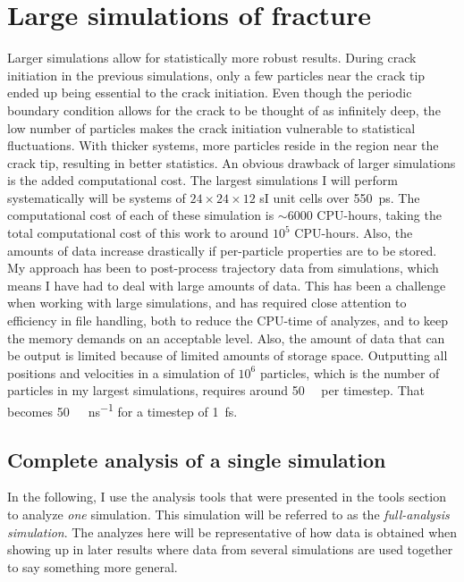 \section{Large simulations of fracture}
Larger simulations allow for statistically more robust results. During crack initiation in the previous simulations, only a few particles near the crack tip ended up being essential to the crack initiation. Even though the periodic boundary condition allows for the crack to be thought of as infinitely deep, the low number of particles makes the crack initiation vulnerable to statistical fluctuations. With thicker systems, more particles reside in the region near the crack tip, resulting in better statistics. An obvious drawback of larger simulations is the added computational cost. The largest simulations I will perform systematically will be systems of $24\times 24\times 12$ sI unit cells over \SI{550}{\pico\second}. The computational cost of each of these simulation is $\sim 6000$ CPU-hours, taking the total computational cost of this work to around $10^5$ CPU-hours. Also, the amounts of data increase drastically if per-particle properties are to be stored. My approach has been to post-process trajectory data from simulations, which means I have had to deal with large amounts of data. This has been a challenge when working with large simulations, and has required close attention to efficiency in file handling, both to reduce the CPU-time of analyzes, and to keep the memory demands on an acceptable level. Also, the amount of data that can be output is limited because of limited amounts of storage space. Outputting all positions and velocities in a simulation of $10^6$ particles, which is the number of particles in my largest simulations, requires around \SI{50}{\mega\byte} per timestep. That becomes \SI{50}{\tera\byte\per\nano\second} for a timestep of \SI{1}{\femto\second}. 

\label{sec:complete_analysis_single_simulation}

\subsection{Complete analysis of a single simulation}
In the following, I use the analysis tools that were presented in the tools section to analyze \emph{one} simulation. This simulation will be referred to as the \emph{full-analysis simulation}. The analyzes here will be representative of how data is obtained when showing up in later results where data from several simulations are used together to say something more general. 

